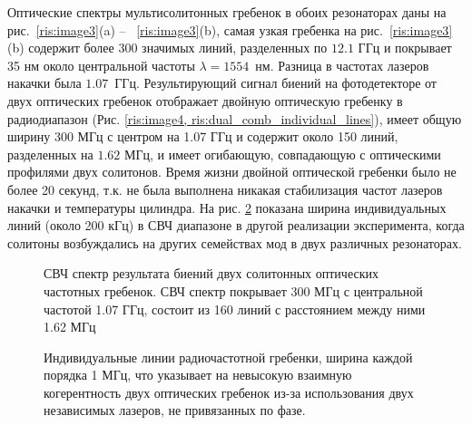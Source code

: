 Оптические спектры мультисолитонных гребенок в обоих резонаторах даны на рис.~\ref{ris:image3}(a) -- ~\ref{ris:image3}(b), самая узкая гребенка на рис.~\ref{ris:image3}(b) содержит более 300 значимых линий, разделенных по $12.1$ ГГц и покрывает 35 нм около центральной частоты $\lambda = 1554$~нм. Разница в частотах лазеров накачки была $1.07$~ГГц. Результирующий сигнал биений на фотодетекторе от двух оптических гребенок отображает двойную оптическую гребенку в радиодиапазон (Рис. \ref{ris:image4, ris:dual_comb_individual_lines}), имеет общую ширину 300 МГц с центром на 1.07 ГГц и содержит около 150 линий, разделенных на $1.62$ МГц, и имеет огибающую, совпадающую с оптическими профилями двух солитонов. Время жизни двойной оптической гребенки было не более 20 секунд, т.к. не была выполнена никакая стабилизация частот лазеров накачки и температуры цилиндра. На рис. \ref{ris:dual_comb_individual_lines} показана ширина индивидуальных линий (около 200 кГц) в СВЧ диапазоне в другой реализации эксперимента, когда солитоны возбуждались на других семействах мод в двух различных резонаторах.

\begin{figure}[ht]
\begin{minipage}[ht]{1\linewidth}
\end{minipage}
\caption{СВЧ спектр результата биений двух солитонных оптических частотных гребенок. СВЧ спектр покрывает 300 МГц с центральной частотой 1.07 ГГц, состоит из 160 линий с расстоянием между ними 1.62 МГц}
\label{ris:image4}
\end{figure}

\begin{figure}[ht]
\begin{minipage}[ht]{1\linewidth}
\end{minipage}
\caption{Индивидуальные линии радиочастотной гребенки, ширина каждой порядка 1 МГц, что указывает на невысокую взаимную когерентность двух оптических гребенок из-за использования двух независимых лазеров, не привязанных по фазе.}
\label{ris:dual_comb_individual_lines}
\end{figure}

